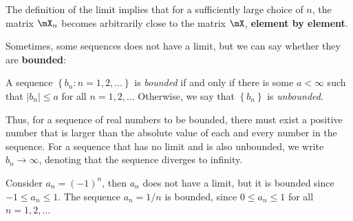 The definition of the limit implies that for a sufficiently large choice of $n$, the matrix $\mX_n$ becomes arbitrarily close to the matrix $\mX$, \textbf{element by element}.


Sometimes, some sequences does not have a limit, but we can say whether they are \textbf{bounded}: 

\begin{definition}\label{definition:bounded_sequence}
 A  sequence $\left\lbrace b_n: n = 1,2,... \right\rbrace$ is \emph{bounded} if and only if there is some $a < \infty$ such that $\left|b_n\right|\leq a$ for all $n = 1,2,...$ Otherwise, we say that $\left\lbrace b_n \right\rbrace$ is \emph{unbounded}.
\end{definition}

Thus, for a sequence of real numbers to be bounded, there must exist a positive number that is larger than the absolute value of each and every number in the sequence. For a sequence that has no limit and is also unbounded, we write $b_n \to \infty$, denoting that the sequence diverges to infinity. 


\begin{example}
Consider $a_n = (-1)^n$, then $a_n$ does not have a limit, but it is bounded since $-1 \leq a_n \leq 1$. The sequence $a_n = 1/n$ is bounded, since $0 \leq a_n\leq 1$ for all $n = 1,2,...$
\end{example}


